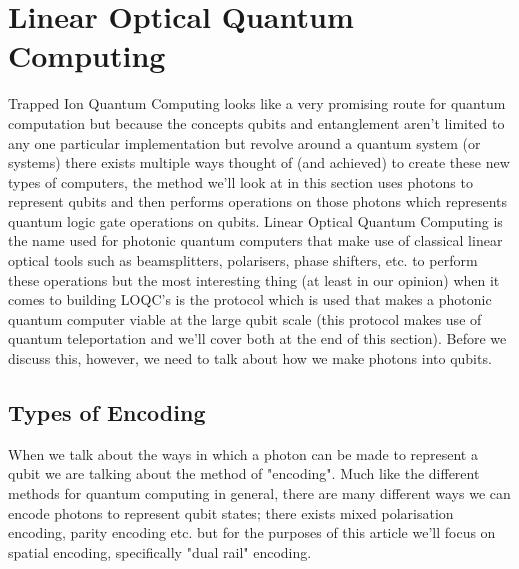 \section{Linear Optical Quantum Computing}
Trapped Ion Quantum Computing looks like a very promising route for quantum computation but because the concepts qubits and entanglement aren't limited to any one particular implementation but revolve around a quantum system (or systems) there exists multiple ways thought of (and achieved) to create these new types of computers, the method we'll look at in this section uses photons to represent qubits and then performs operations on those photons which represents quantum logic gate operations on qubits. Linear Optical Quantum Computing is the name used for photonic quantum computers that make use of classical linear optical tools such as beamsplitters, polarisers, phase shifters, etc. to perform these operations but the most interesting thing (at least in our opinion) when it comes to building LOQC's is the protocol which is used that makes a photonic quantum computer viable at the large qubit scale (this protocol makes use of quantum teleportation and we'll cover both at the end of this section). Before we discuss this, however, we need to talk about how we make photons into qubits. 

\subsection{Types of Encoding}
When we talk about the ways in which a photon can be made to represent a qubit we are talking about the method of "encoding". Much like the different methods for quantum computing in general, there are many different ways we can encode photons to represent qubit states; there exists mixed polarisation encoding, parity encoding etc. but for the purposes of this article we'll focus on spatial encoding, specifically "dual rail" encoding. 

